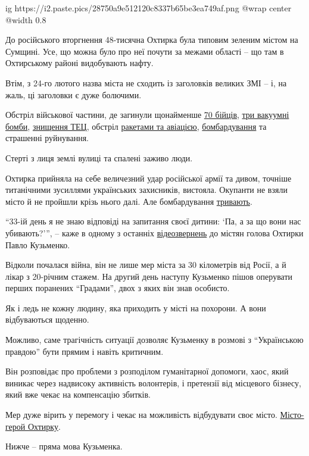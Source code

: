  
 
 
 
 

\ifcmt
  ig https://i2.paste.pics/28750a9e512120c8337b65be3ea749af.png
  @wrap center
  @width 0.8
\fi

До російського вторгнення 48-тисячна Охтирка була типовим зеленим містом на
Сумщині. Усе, що можна було про неї почути за межами області – що там в
Охтирському районі видобувають нафту. 

Втім, з 24-го лютого назва міста не сходить із заголовків великих ЗМІ – і, на
жаль, ці заголовки є дуже болючими. 

Обстріл військової частини, де загинули щонайменше
\href{https://www.pravda.com.ua/news/2022/03/1/7327015/}{70 бійців},
\href{https://www.pravda.com.ua/news/2022/03/1/7326990/}{три вакуумні бомби},
\href{https://www.pravda.com.ua/news/2022/03/4/7328015/}{знищення ТЕЦ}, обстріл
\href{https://www.pravda.com.ua/news/2022/03/8/7329481/}{ракетами та авіацією},
\href{https://www.pravda.com.ua/news/2022/03/26/7334618/}{бомбардування} та
страшенні руйнування.

Стерті з лиця землі вулиці та спалені заживо люди.

Охтирка прийняла на себе величезний удар російської армії та дивом, точніше
титанічними зусиллями українських захисників, вистояла. Окупанти не взяли місто
й не пройшли крізь нього далі. Але бомбардування \href{https://www.pravda.com.ua/news/2022/03/26/7334618/}{тривають}.

\enquote{33-ій день я не знаю відповіді на запитання своєї дитини: \enquote{Па,
а за що вони нас убивають?}}, – каже в одному з останніх
\href{https://www.facebook.com/permalink.php?story_fbid=1133330780777119&id=100023006243706}{відеозвернень}
до містян голова Охтирки Павло Кузьменко.

Відколи почалася війна, він не лише мер міста за 30 кілометрів від Росії, а й
лікар з 20-річним стажем. На другий день наступу Кузьменко пішов оперувати
перших поранених \enquote{Градами}, двох з яких він знав особисто.

Як і ледь не кожну людину, яка приходить у місті на похорони. А вони
відбуваються щоденно. 

Можливо, саме трагічність ситуації дозволяє Кузьменку в розмові з
\enquote{Українською правдою} бути прямим і навіть критичним. 

Він розповідає про проблеми з розподілом гуманітарної допомоги, хаос, який
виникає через надвисоку активність волонтерів, і претензії від місцевого
бізнесу, який вже чекає на компенсацію збитків.

Мер дуже вірить у перемогу і чекає на можливість відбудувати своє місто.
\href{https://www.pravda.com.ua/news/2022/03/25/7334331/index.amp}{Місто-герой Охтирку}.

Нижче – пряма мова Кузьменка.
